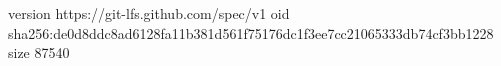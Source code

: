 version https://git-lfs.github.com/spec/v1
oid sha256:de0d8ddc8ad6128fa11b381d561f75176dc1f3ee7cc21065333db74cf3bb1228
size 87540
